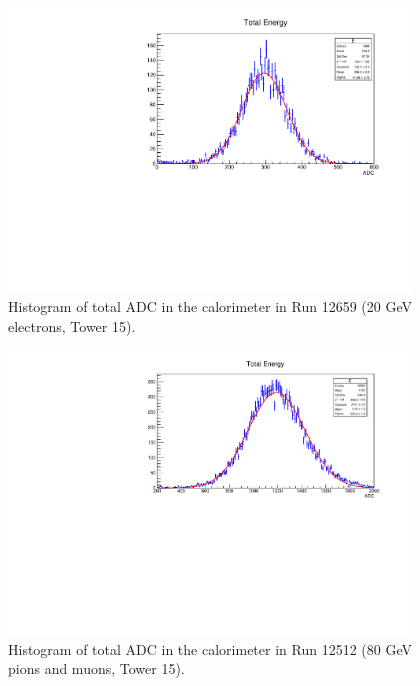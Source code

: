 %

\begin{figure}[p]
	\centering
	\includegraphics[width=0.95\textwidth]{../Pictures/IDEA/totalEnergyBoth.pdf}
	\caption{Histogram of total \acrshort{ADC} in the calorimeter in Run 12659 (20 GeV electrons, Tower 15).}
	\label{figure:testbeam/results/total-adc-20}
\end{figure}

\begin{figure}[p]
	\centering
	\includegraphics[width=0.95\textwidth]{../Pictures/IDEA/totalEnergy80GeV.pdf}
	\caption{Histogram of total \acrshort{ADC} in the calorimeter in Run 12512 (80 GeV pions and muons, Tower 15).}
	\label{figure:testbeam/results/total-adc-80}
\end{figure}


